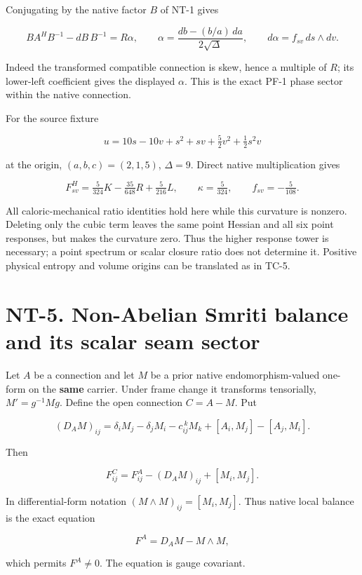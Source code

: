 \documentclass[
  11pt,
]{article}
\begin{document}
Conjugating by the native factor \(B\) of NT-1 gives

\[
BA^HB^{-1}-dB\,B^{-1}=R\alpha,\qquad
\alpha=\frac{db-(b/a)\,da}{2\sqrt\Delta},\qquad
d\alpha=f_{sv}\,ds\wedge dv.
\]

Indeed the transformed compatible connection is skew, hence a multiple
of \(R\); its lower-left coefficient gives the displayed \(\alpha\).
This is the exact PF-1 phase sector within the native connection.

For the source fixture

\[
u=10s-10v+s^2+sv+\tfrac52v^2+\tfrac12s^2v
\]

at the origin, \((a,b,c)=(2,1,5)\), \(\Delta=9\). Direct native
multiplication gives

\[
F^H_{sv}=\tfrac5{324}K-\tfrac{35}{648}R+\tfrac5{216}L,
\qquad \kappa=\tfrac5{324},\qquad f_{sv}=-\tfrac5{108}.
\]

All caloric-mechanical ratio identities hold here while this curvature
is nonzero. Deleting only the cubic term leaves the same point Hessian
and all six point responses, but makes the curvature zero. Thus the
higher response tower is necessary; a point spectrum or scalar closure
ratio does not determine it. Positive physical entropy and volume
origins can be translated as in TC-5.

\hypertarget{nt-5.-non-abelian-smriti-balance-and-its-scalar-seam-sector}{%
\section{NT-5. Non-Abelian Smriti balance and its scalar seam
sector}\label{nt-5.-non-abelian-smriti-balance-and-its-scalar-seam-sector}}

Let \(A\) be a connection and let \(M\) be a prior native
endomorphism-valued one-form on the \textbf{same} carrier. Under frame
change it transforms tensorially, \(M'=g^{-1}Mg\). Define the open
connection \(C=A-M\). Put

\[
(D_A M)_{ij}=\delta_iM_j-\delta_jM_i-c_{ij}^{\ k}M_k
                  +[A_i,M_j]-[A_j,M_i].
\]

Then

\[
\boxed{F^C_{ij}=F^A_{ij}-(D_A M)_{ij}+[M_i,M_j].}
\]

In differential-form notation \((M\wedge M)_{ij}=[M_i,M_j]\). Thus
native local balance is the exact equation

\[
\boxed{F^A=D_A M-M\wedge M,}
\]

which permits \(F^A\ne0\). The equation is gauge covariant.
\end{document}
